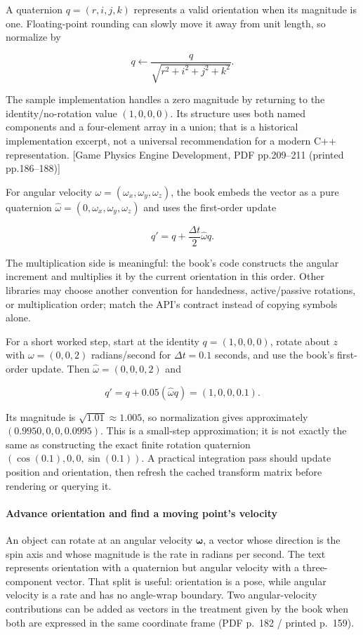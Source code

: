 A quaternion \(q=(r,i,j,k)\) represents a valid orientation when its magnitude is one. Floating-point rounding can slowly move it away from unit length, so normalize by

\[
q\leftarrow\frac{q}{\sqrt{r^2+i^2+j^2+k^2}}.
\]

The sample implementation handles a zero magnitude by returning to the identity/no-rotation value \((1,0,0,0)\). Its structure uses both named components and a four-element array in a union; that is a historical implementation excerpt, not a universal recommendation for a modern C++ representation. {[}Game Physics Engine Development, PDF pp.209--211 (printed pp.186--188){]}

For angular velocity \(\omega=(\omega_x,\omega_y,\omega_z)\), the book embeds the vector as a pure quaternion \(\hat\omega=(0,\omega_x,\omega_y,\omega_z)\) and uses the first-order update

\[
q' = q+\frac{\Delta t}{2}\hat\omega q.
\]

The multiplication side is meaningful: the book's code constructs the angular increment and multiplies it by the current orientation in this order. Other libraries may choose another convention for handedness, active/passive rotations, or multiplication order; match the API's contract instead of copying symbols alone.

For a short worked step, start at the identity \(q=(1,0,0,0)\), rotate about \(z\) with \(\omega=(0,0,2)\) radians/second for \(\Delta t=0.1\) seconds, and use the book's first-order update. Then \(\hat\omega=(0,0,0,2)\) and

\[
q'=q+0.05(\hat\omega q)=(1,0,0,0.1).
\]

Its magnitude is \(\sqrt{1.01}\approx1.005\), so normalization gives approximately \((0.9950,0,0,0.0995)\). This is a small-step approximation; it is not exactly the same as constructing the exact finite rotation quaternion \(({\cos(0.1)},0,0,{\sin(0.1)})\). A practical integration pass should update position and orientation, then refresh the cached transform matrix before rendering or querying it.

\paragraph{Advance orientation and find a moving point's velocity}\label{06-engine-ii-ch025-advance-orientation-and-find-a-moving-points-velocity}

An object can rotate at an angular velocity \(\boldsymbol{\omega}\), a vector whose direction is the spin axis and whose magnitude is the rate in radians per second. The text represents orientation with a quaternion but angular velocity with a three-component vector. That split is useful: orientation is a pose, while angular velocity is a rate and has no angle-wrap boundary. Two angular-velocity contributions can be added as vectors in the treatment given by the book when both are expressed in the same coordinate frame (PDF p.~182 / printed p.~159).

